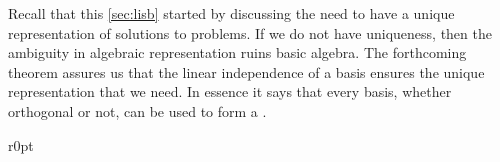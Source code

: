 Recall that this \cref{sec:lisb} started by discussing the need to have a unique representation of solutions to problems.
If we do not have uniqueness, then the ambiguity in algebraic representation ruins basic algebra.
The forthcoming theorem assures us that the linear independence of a basis ensures the unique representation that we need.
In essence it says that every basis, whether orthogonal or not, can be used to form a .



\begin{wrapfigure}[6]r{0pt}
\end{wrapfigure}
